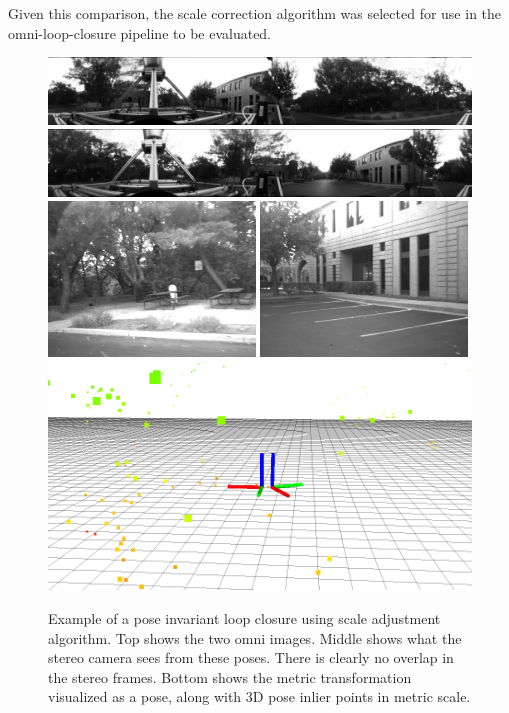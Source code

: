 Given this comparison, the scale correction algorithm was selected for use in the omni-loop-closure pipeline to be evaluated.

\begin{figure}[H]
  \centering
    \includegraphics[width=1.0\textwidth]{chapters/images/omni_source}\\
    \includegraphics[width=1.0\textwidth]{chapters/images/omni_target}\\
    \includegraphics[width=0.49\textwidth]{chapters/images/stereo_source}
    \includegraphics[width=0.49\textwidth]{chapters/images/stereo_target}\\
    \includegraphics[width=1.0\textwidth]{chapters/images/loop_closure_pose}
  \caption{Example of a pose invariant loop closure using scale adjustment algorithm.  Top shows the two omni images.  Middle shows what the stereo camera sees from these poses.  There is clearly no overlap in the stereo frames.  Bottom shows the metric transformation visualized as a pose, along with 3D pose inlier points in metric scale.}
  \label{fig:}
\end{figure}
